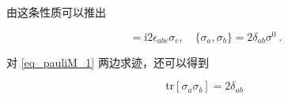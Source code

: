 由这条性质可以推出
\begin{lemma}{}
\begin{equation}
[\sigma_a,\sigma_b] = \mathrm{i}2\epsilon_{abc}\sigma_c,\quad \{\sigma_a,\sigma_b\}=2\delta_{ab}\sigma^0~.
\end{equation}
\end{lemma}
对 \autoref{eq_pauliM_1} 两边求迹，还可以得到
\begin{lemma}{}
\begin{equation}
\mathrm{tr}[\sigma_a \sigma_b]= 2\delta_{ab} ~
\end{equation}
\end{lemma}
